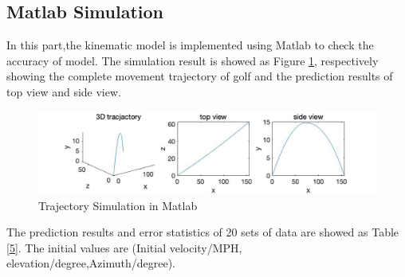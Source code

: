 \subsection{Matlab Simulation}
In this part,the kinematic model is implemented using Matlab to check  the accuracy of model. The simulation result is showed as Figure \ref{fig:matlab}, respectively showing the complete movement trajectory of golf and the prediction results of top view and side view.
\begin{figure}[H]
    \centering
    \includegraphics[width=\textwidth]{figure/Matlab.jpg}
    \caption{Trajectory Simulation in Matlab}
    \label{fig:matlab}
\end{figure}
The prediction results and error statistics of 20 sets of data are showed as Table \ref{5}. The initial values are (Initial velocity/MPH, elevation/degree,Azimuth/degree).
